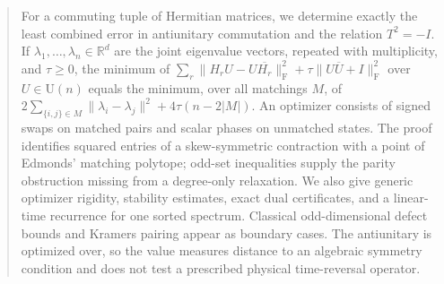 \documentclass[11pt]{article}
\newcommand{\U}{\mathrm U}
\newcommand{\F}{\mathrm F}
\begin{document}
\hypnosmaketitle
\begin{abstract}
For a commuting tuple of Hermitian matrices, we determine exactly the
least combined error in antiunitary commutation and the relation $T^2=-I$.
If $\lambda_1,\ldots,\lambda_n\in\mathbb R^d$ are the joint eigenvalue vectors, repeated with multiplicity, and $\tau\ge0$, the minimum of
$\sum_r\|H_rU-U\overline{H_r}\|_\F^2+
\tau\|U\overline U+I\|_\F^2$ over $U\in\U(n)$ equals the minimum, over all
matchings $M$, of
$2\sum_{\{i,j\}\in M}\|\lambda_i-\lambda_j\|^2+
4\tau(n-2|M|)$.
An optimizer consists of signed swaps on matched pairs and scalar phases
on unmatched states. The proof identifies squared entries of a
skew-symmetric contraction with a point of Edmonds' matching polytope;
odd-set inequalities supply the parity obstruction missing from a
degree-only relaxation. We also give generic optimizer rigidity,
stability estimates, exact dual certificates, and a linear-time recurrence
for one sorted spectrum. Classical odd-dimensional defect bounds and
Kramers pairing appear as boundary cases. The antiunitary is optimized over,
so the value measures distance to an algebraic symmetry condition and does
not test a prescribed physical time-reversal operator.
\end{abstract}
\end{document}
